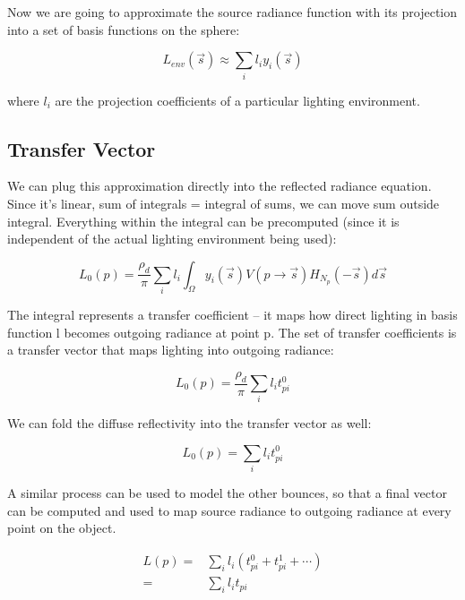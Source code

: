 Now we are going to approximate the source radiance function with its projection into a set of basis functions on the sphere:

\begin{equation*}
	L_{env}(\vec{s})\approx\sum_{i}l_iy_i(\vec{s})
\end{equation*}

where $l_i$ are the projection coefficients of a particular lighting environment. 



\subsection{Transfer Vector}
We can plug this approximation directly into the reflected radiance equation. Since it's linear, sum of integrals = integral of sums, we can move sum outside integral. Everything within the integral can be precomputed (since it is independent of the actual lighting environment being used):

\begin{equation*}
	L_0(p)=\frac{\rho_d}{\pi}\sum_i l_i\int_{\Omega}y_i(\vec{s})V(p\to\vec{s})H_{N_p}(-\vec{s})d\vec{s}
\end{equation*}

The integral represents a transfer coefficient -- it maps how direct lighting in basis function l becomes outgoing radiance at point p. The set of transfer coefficients is a transfer vector that maps lighting into outgoing radiance:

\begin{equation*}
	L_0(p)=\frac{\rho_d}{\pi}\sum_i l_i t^{0}_{pi}
\end{equation*}

We can fold the diffuse reflectivity into the transfer vector as well:

\begin{equation*}
	L_0(p)=\sum_i l_i t^{0}_{pi}
\end{equation*} 

A similar process can be used to model the other bounces, so that a final vector can be computed and used to map source radiance to outgoing radiance at every point on the object.

\begin{equation*}
	\begin{aligned}
		L(p)=&\sum_i l_i(t^{0}_{pi}+t^{1}_{pi}+\cdots)\\
		    =&\sum_i l_i t_{pi}
	\end{aligned}
\end{equation*}



